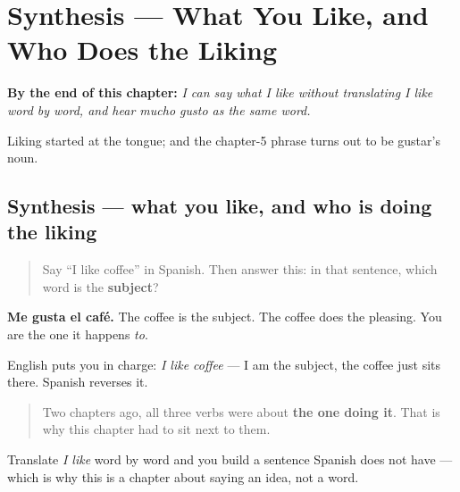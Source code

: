 
\chapter{Synthesis --- What You Like, and Who Does the Liking}
\label{ch:spanish-synthesis-gustar}

\begin{chapteropening}
\textbf{By the end of this chapter:} \emph{I can say what I like without translating I like word by word, and hear mucho gusto as the same word.}

Liking started at the tongue; and the chapter-5 phrase turns out to be gustar's noun.
\end{chapteropening}

\section[Practice]{Synthesis — what you like, and who is doing the liking}

\label{lesson:ES-C35-sintesis-gustar}



\begin{quote}
Say \textquotedblleft{}I like coffee\textquotedblright{} in Spanish. Then answer this: in that sentence, which word is the \textbf{subject}?
\end{quote}

\begin{grammarlens}[title={Grammar Lens: the sentence that will not let you be the subject}]
\textbf{Me gusta el café.} The coffee is the subject. The coffee does the pleasing. You are the one it happens \emph{to}.

English puts you in charge: \emph{I like coffee} — I am the subject, the coffee just sits there. Spanish reverses it.

\begin{quote}
Two chapters ago, all three verbs were about \textbf{the one doing it}. That is why this chapter had to sit next to them.
\end{quote}

Translate \emph{I like} word by word and you build a sentence Spanish does not have — which is why this is a chapter about saying an idea, not a word.
\end{grammarlens}

